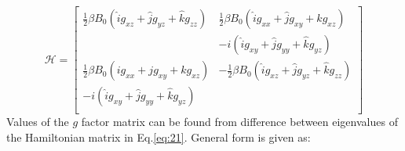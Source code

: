\begin{equation}\label{eq:21}
\mathcal{H} = \begin{bmatrix}
       \frac{1}{2}\beta B_0( \hat{i}g_{xz}+\hat{j}g_{yz}+\hat{k}g_{zz}) & \frac{1}{2}\beta B_0( \hat{i}g_{xx}+\hat{j}g_{xy}+\hat{k}g_{xz})          \\[0.3em]
  & -i(\hat{i}g_{xy}+\hat{j}g_{yy}+\hat{k}g_{yz}) \\[0.3em]      
       \frac{1}{2}\beta B_0( ig_{xx}+jg_{xy}+kg_{xz})  &  -\frac{1}{2}\beta B_0( \hat{i}g_{xz}+\hat{j}g_{yz}+\hat{k}g_{zz}) \\[0.3em]
        -i(\hat{i}g_{xy}+\hat{j}g_{yy}+\hat{k}g_{yz})  & \\[0.3em]
     \end{bmatrix}
\end{equation}
Values of the $g$ factor matrix can be found from difference between eigenvalues of the Hamiltonian matrix in Eq.\ref{eq:21}. General form is given as: 

